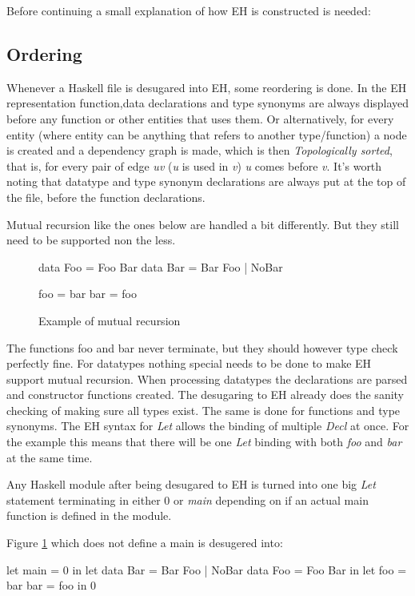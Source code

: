 Before continuing a small explanation of how EH is constructed is needed:
\subsection{Ordering}
Whenever a Haskell file is desugared into EH, some reordering is done. In the EH representation function,data declarations and type synonyms are always displayed before any function or other entities that uses them. Or alternatively, for every entity (where entity can be anything that refers to another type/function) a node is created and a dependency graph is made, which is then \emph{Topologically sorted}, that is, for every pair of edge \emph{uv} (\emph{u} is used in \emph{v}) \emph{u} comes before \emph{v}. It's worth noting that datatype and type synonym declarations are always put at the top of the file, before the function declarations.

Mutual recursion like the ones below are handled a bit differently. But they still need to be supported non the less.

\begin{figure}
\begin{code}
data Foo = Foo Bar
data Bar = Bar Foo | NoBar

foo = bar
bar = foo
\end{code}
\caption{Example of mutual recursion}
\label{fig:mutrecurse}
\end{figure}

The functions foo and bar never terminate, but they should however type check perfectly fine. For datatypes nothing special needs to be done to make EH support mutual recursion. When processing datatypes the declarations are parsed and constructor functions created. The desugaring to EH already does the sanity checking of making sure all types exist. The same is done for functions and type synonyms. The EH syntax for \emph{Let} allows the binding of multiple \emph{Decl} at once. For the example this means that there will be one \emph{Let} binding with both \emph{foo} and \emph{bar} at the same time.

Any Haskell module after being desugared to EH is turned into one big \emph{Let} statement terminating in either 0 or \emph{main} depending on if an actual main function is defined in the module.

Figure \ref{fig:mutrecurse} which does not define a main is desugered into:

\begin{code}
let main = 0
in let data Bar  = Bar Foo | NoBar
       data Foo  = Foo Bar
   in let foo = bar
          bar = foo
      in 0
\end{code}

